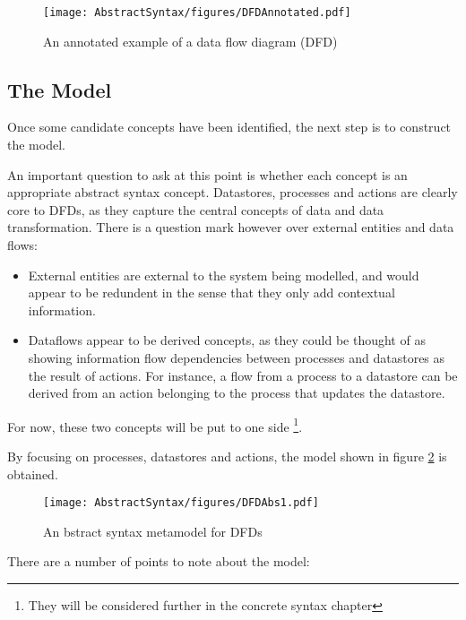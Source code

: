 \begin{figure}[htb]
\begin{center}
\texttt{[image: AbstractSyntax/figures/DFDAnnotated.pdf]}
\caption{An annotated example of a data flow diagram (DFD)}
\label{dfdannotated}
\end{center}
\end{figure}

\subsection{The Model}

Once some candidate concepts have been identified, the next step is to construct the model. 

An important question to ask at this point is whether each concept is an appropriate abstract syntax concept. Datastores, processes and actions are clearly core to DFDs, as they capture the central concepts of data and data transformation. There is a question mark however over external entities and data flows:

\begin{itemize} 
\item External entities are external to the system being modelled, and would appear to be redundent in the sense that they only add contextual information. \item Dataflows appear to be derived concepts, as they could be thought of as showing information flow dependencies between processes and datastores as the result of actions. For instance, a flow from a process to a datastore can be derived from an action belonging to the process that updates the datastore.
\end{itemize}

\noindent For now, these two concepts will be put to one side \footnote{They will be considered further in the concrete syntax chapter}. 

By focusing on processes, datastores and actions, the model shown in figure \ref{dfdabs1} is obtained.

\begin{figure}[htb]
\begin{center}
\texttt{[image: AbstractSyntax/figures/DFDAbs1.pdf]}
\caption{An bstract syntax metamodel for DFDs}
\label{dfdabs1}
\end{center}
\end{figure}

There are a number of points to note about the model:

